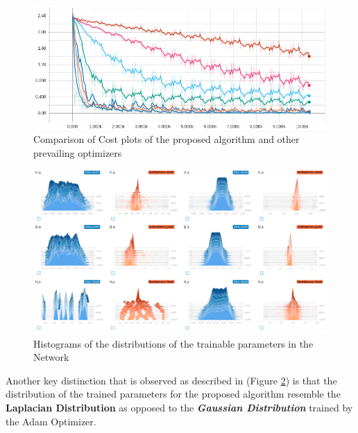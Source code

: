 \documentclass{article}
\begin{document}
\begin{figure}[h]
\begin{center}
\includegraphics[scale=1.2]{diagrams/ranik_vs_all_paper.png}
\end{center}
\caption{Comparison of Cost plots of the proposed algorithm and other prevailing optimizers}
\label{fig:figure_8}
\end{figure}

\begin{figure}[h]
\begin{center}
\includegraphics[width=1.0 \linewidth]{diagrams/histograms_ranik_tn_paper.png}
\end{center}
\caption{Histograms of the distributions of the trainable parameters in the Network}
\label{fig:figure_9}
\end{figure}


Another key distinction that is observed as described in (Figure \ref{fig:figure_9}) is that the distribution of the trained parameters for the proposed algorithm resemble the \textbf{\textbf{Laplacian Distribution}} as opposed to the \textbf{\textit{Gaussian Distribution}} trained by the Adam Optimizer.
\end{document}
